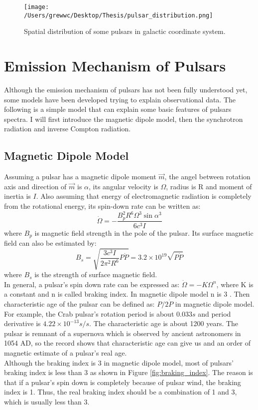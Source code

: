 \documentclass[12pt]{report}
\begin{document}
    \begin{figure}[!htp]
      \centering
      \texttt{[image: /Users/grewwc/Desktop/Thesis/pulsar\_distribution.png]}
      \caption{Spatial distribution of some pulsars in galactic coordinate system.}
      \label{fig: spatial_distribution}
    \end{figure}
    
    \section{Emission Mechanism of Pulsars}
      Although the emission mechanism of pulsars has not been fully understood yet, some 
      models have been developed 
      trying to explain observational data. The following is a simple model that can explain 
      some basic features of pulsars spectra. I will first introduce the magnetic dipole model, 
      then the synchrotron radiation and inverse Compton radiation. 
      
      \subsection{Magnetic Dipole Model}
        Assuming a pulsar has a magnetic dipole moment $\vec{m}$, the angel between rotation axis and 
        direction of 
        $\vec{m}$ is $\alpha$, its angular velocity is $\Omega$, radius is R and moment of inertia is $I$. 
        Also assuming that energy of electromagnetic radiation is completely from the rotational energy, 
        its spin-down rate can be written as: 
        $$
            \dot{\Omega}=-\frac{B_p^2 R^6 \Omega^3 \sin{\alpha}^3}{6c^3I}
        $$
        where $B_p$ is magnetic field strength in the pole of the pulsar. Its surface magnetic field can 
        also be estimated by:
        $$
            B_s=\sqrt{\frac{3c^3I}{2\pi^2R^6}P\dot{P}}=3.2\times 10^{19}\sqrt{P\dot{P}}
        $$
        where $B_s$ is the strength of surface magnetic field. \\
        \indent In general, a pulsar's spin down rate can be expressed as: $\dot{\Omega}=-K\Omega^{n}$, 
        where K is a constant and n is called braking index. In magnetic dipole model n is 
        3 \cite{Tong2015}. Then characteristic age of the pulsar can be defined as: 
        $P/2\dot{P}$ in magnetic dipole model. For example, the Crab 
        pulsar's rotation period is about $0.033s$ and period derivative is 
        $4.22\times 10^{-13}s/s$. The characteristic age is about 1200 years. The pulsar 
        is remnant of a supernova which is observed by ancient astronomers in 1054 
        AD, so the record shows that characteristic age can give us and an order of magnetic 
        estimate of a pulsar's real age. \\
        \indent 
        Although the braking index is 3 in magnetic dipole model, most of pulsars' braking 
        index is less than 3 as shown in Figure \ref{fig:braking_index}. The reason is that if
        a pulsar's spin down is completely because of pulsar wind, the braking index is 1. 
        Thus, the real braking index should be a combination of 1 and 3, which is usually 
        less than 3. \cite{PhysRevD.91.063007}
        
\end{document}
